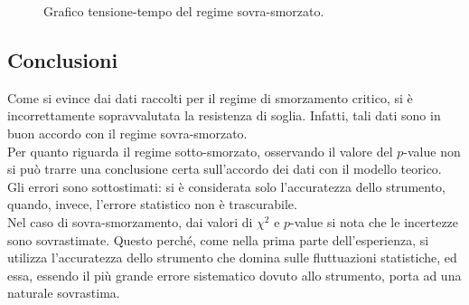 \documentclass[a4paper]{article}
\begin{document}
\begin{figure}[ht]
	\centering
    	\hspace*{-0.75cm}
	\caption[Grafico RLC sovra-smorzato]{Grafico tensione-tempo del regime sovra-smorzato.}
	\label{fig:RLC_graph_sovr}
\end{figure}

\subsection{Conclusioni}
Come si evince dai dati raccolti per il regime di smorzamento critico, si è incorrettamente sopravvalutata la resistenza di soglia. Infatti, tali dati sono in buon accordo con il regime sovra-smorzato.\\
Per quanto riguarda il regime sotto-smorzato, osservando il valore del $p$-value non si può trarre una conclusione certa sull'accordo dei dati con il modello teorico. Gli errori sono sottostimati: si è considerata solo l'accuratezza dello strumento, quando, invece, l'errore statistico non è trascurabile.\\
Nel caso di sovra-smorzamento, dai valori di $\chi^2$ e $p$-value si nota che le incertezze sono sovrastimate. Questo perché, come nella prima parte dell'esperienza, si utilizza l'accuratezza dello strumento che domina sulle fluttuazioni statistiche, ed essa, essendo il più grande errore sistematico dovuto allo strumento, porta ad una naturale sovrastima.
\clearpage
\end{document}
